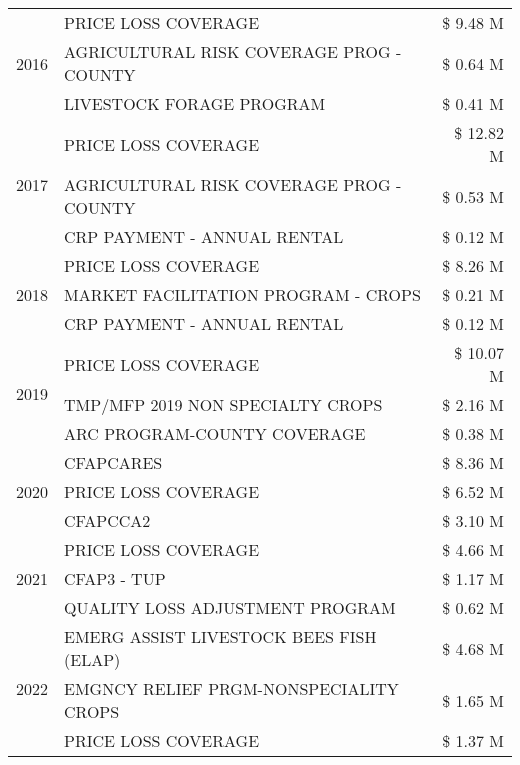\begin{tabular}{llr}
\cline{1-3}
\multirow[t]{3}{*}{2016} & PRICE LOSS COVERAGE & \$ 9.48 M \\
 & AGRICULTURAL RISK COVERAGE PROG - COUNTY & \$ 0.64 M \\
 & LIVESTOCK FORAGE PROGRAM & \$ 0.41 M \\
\cline{1-3}
\multirow[t]{3}{*}{2017} & PRICE LOSS COVERAGE & \$ 12.82 M \\
 & AGRICULTURAL RISK COVERAGE PROG - COUNTY & \$ 0.53 M \\
 & CRP PAYMENT - ANNUAL RENTAL & \$ 0.12 M \\
\cline{1-3}
\multirow[t]{3}{*}{2018} & PRICE LOSS COVERAGE & \$ 8.26 M \\
 & MARKET FACILITATION PROGRAM - CROPS & \$ 0.21 M \\
 & CRP PAYMENT - ANNUAL RENTAL & \$ 0.12 M \\
\cline{1-3}
\multirow[t]{3}{*}{2019} & PRICE LOSS COVERAGE & \$ 10.07 M \\
 & TMP/MFP 2019 NON SPECIALTY CROPS & \$ 2.16 M \\
 & ARC PROGRAM-COUNTY COVERAGE & \$ 0.38 M \\
\cline{1-3}
\multirow[t]{3}{*}{2020} & CFAPCARES & \$ 8.36 M \\
 & PRICE LOSS COVERAGE & \$ 6.52 M \\
 & CFAPCCA2 & \$ 3.10 M \\
\cline{1-3}
\multirow[t]{3}{*}{2021} & PRICE LOSS COVERAGE & \$ 4.66 M \\
 & CFAP3 - TUP & \$ 1.17 M \\
 & QUALITY LOSS ADJUSTMENT PROGRAM & \$ 0.62 M \\
\cline{1-3}
\multirow[t]{3}{*}{2022} & EMERG ASSIST LIVESTOCK BEES FISH (ELAP) & \$ 4.68 M \\
 & EMGNCY RELIEF PRGM-NONSPECIALITY CROPS & \$ 1.65 M \\
 & PRICE LOSS COVERAGE & \$ 1.37 M \\
\cline{1-3}
\bottomrule
\end{tabular}
